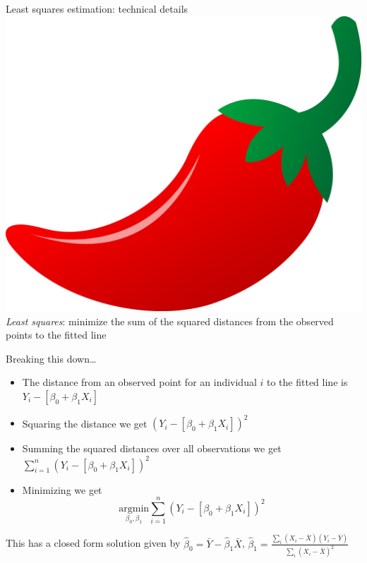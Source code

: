 \documentclass[10pt,t]{beamer}
\begin{document}
\begin{frame}{Least squares estimation: technical details \includegraphics[scale=0.01]{chilipepper.png}}
\textit{Least squares}: minimize the sum of the squared distances from the observed points to the fitted line

\vspace{0.3cm}

Breaking this down\dots

\vspace{0.3cm}

\begin{itemize}
	\item The distance from an observed point for an individual $i$ to the fitted line is $Y_i - [\beta_0 + \beta_1 X_i]$
	\item Squaring the distance we get $(Y_i - [\beta_0 + \beta_1 X_i])^2$
	\item Summing the squared distances over all observations we get $\sum_{i = 1}^n (Y_i - [\beta_0 + \beta_1 X_i])^2$
	\item Minimizing we get $$\underset{\beta_0, \beta_1}{\text{argmin}} \sum_{i = 1}^n (Y_i - [\beta_0 + \beta_1 X_i])^2$$
\end{itemize}

\vspace{0.3cm}

\small This has a closed form solution given by $\hat{\beta}_0 =  \bar{Y} - \hat{\beta}_1 \bar{X}$, $\hat{\beta}_1 = \frac{\sum_i (X_i - \bar{X}) (Y_i - \bar{Y})}{\sum_i (X_i - \bar{X})^2}$

\end{frame}
\end{document}

